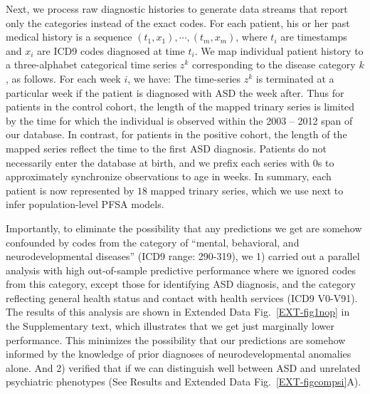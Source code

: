 \documentclass[onecolumn,,10pt]{IEEEtran}
\def\treatment{positive\xspace}
\begin{document}
Next, we process raw diagnostic histories to generate data streams that report only the categories instead of the exact codes. For each patient, his or her  past  medical history is a sequence $(t_1,x_1),\cdots,(t_m,x_m)$, where $t_i$ are timestamps and $x_i$ are ICD9 codes diagnosed at time $t_i$.  We map individual patient history to a three-alphabet categorical time series $z^k$ corresponding to the disease category $k$,  as follows. For each week $i$, we have: 
\noindent
                  The time-series $z^k$ is terminated at a particular week if the patient is diagnosed with ASD the week after. Thus for patients in the control cohort, the length of the mapped trinary series is limited by the time for which the individual is observed within the  2003 -- 2012 span of our database. In contrast, for patients in  the \treatment cohort, the length of the mapped series reflect the time to the first ASD diagnosis. Patients do not necessarily enter the database at birth, and we prefix each series with 0s to  approximately synchronize observations to age in weeks. 
In summary, each patient is now represented by $18$ mapped trinary series, which we  use next  to infer population-level PFSA models. 

Importantly, to eliminate the possibility that any predictions we get are somehow confounded by codes from 
the  category of  ``mental, behavioral, and neurodevelopmental diseases'' (ICD9 range: 290-319), we  1) carried out a parallel analysis with high out-of-sample predictive performance where we ignored codes from this category, except those for identifying ASD diagnosis, and the category reflecting general health status and contact with health services (ICD9 V0-V91). The results of this analysis are shown in Extended Data Fig.~\ref{EXT-fig1nop} in the Supplementary text, which illustrates that we get just marginally lower performance. This minimizes  the possibility that our predictions are somehow informed by the knowledge of prior diagnoses of neurodevelopmental anomalies alone.  And 2) verified that if we  can distinguish well between ASD and  unrelated psychiatric phenotypes (See Results and Extended Data Fig.~\ref{EXT-figcompsi}A). 
                  
\end{document}
